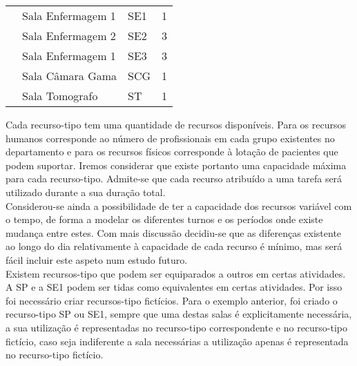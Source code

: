 \begin{table}[H]
\begin{tabular}{c|l|l|l}
                                                                                               & Sala Enfermagem 1                                & SE1         & 1          \\
                                                                                               & Sala Enfermagem 2                                & SE2         & 3          \\
                                                                                               & Sala Enfermagem 1                                & SE3         & 3          \\
                                                                                               & Sala Câmara Gama                                 & SCG         & 1          \\
                                                                                               & Sala Tomografo                                   & ST          & 1         
\end{tabular}
\end{table}

Cada recurso-tipo tem uma quantidade de recursos disponíveis. Para os recursos humanos corresponde ao número de profissionais em cada grupo existentes no departamento e para os recursos físicos corresponde à lotação de pacientes que podem suportar. Iremos considerar que existe portanto uma capacidade máxima para cada recurso-tipo. Admite-se que cada recurso atribuído a uma tarefa será utilizado durante a sua duração total.\\

Considerou-se ainda a possibilidade de ter a capacidade dos recursos variável com o tempo, de forma a modelar os diferentes turnos e os períodos onde existe mudança entre estes. Com mais discussão decidiu-se que as diferenças existente ao longo do dia relativamente à capacidade de cada recurso é mínimo, mas será fácil incluir este aspeto num estudo futuro.\\

Existem recursos-tipo que podem ser equiparados a outros em certas atividades. A SP e a SE1 podem ser tidas como equivalentes em certas atividades. Por isso foi necessário criar recursos-tipo fictícios. Para o exemplo anterior, foi criado o recurso-tipo SP ou SE1, sempre que uma destas salas é explicitamente necessária, a sua utilização é representadas no recurso-tipo correspondente e no recurso-tipo fictício, caso seja indiferente a sala necessárias a utilização apenas é representada no recurso-tipo fictício.\\

